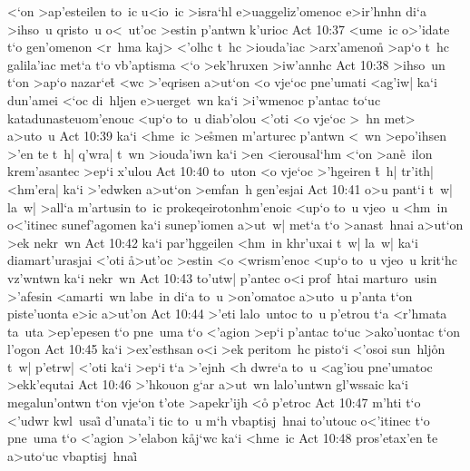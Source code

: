 <`on
>ap'esteilen
to~ic
u<io~ic
>isra`hl
e>uaggeliz'omenoc
e>ir'hnhn
di`a
>ihso~u
qristo~u
o<~ut'oc
>estin
p'antwn
k'urioc\bibvsend
\vs Act 10:37
<ume~ic
o>'idate
t`o
gen'omenon
<r~hma
kaj>
<'olhc
t~hc
>iouda'iac
>arx'ameno\r{n}
>ap`o
t~hc
galila'iac
met`a
t`o
vb'aptisma
<`o
>ek'hruxen
>iw'annhc\bibvsend
\vs Act 10:38
>ihso~un
t`on
>ap`o
nazar`e\r{t}
<wc
>'eqrisen
a>ut`on
<o
vje`oc
pne'umati
<ag'iw|
ka`i
dun'amei
<`oc
di~hljen
e>uerget~wn
ka`i
>i'wmenoc
p'antac
to`uc
katadunasteuom'enouc
<up`o
to~u
diab'olou
<'oti
<o
vje`oc
>~hn
met>
a>uto~u\bibvsend
\vs Act 10:39
ka`i
<hme~ic
>e\r{s}men
m'arturec
p'antwn
<~wn
>epo'ihsen
>'en
te
t~h|
q'wra|
t~wn
>iouda'iwn
ka`i
>en
<ierousal`hm
<`on
>an\r{e}~ilon
krem'asantec
>ep`i
x'ulou\bibvsend
\vs Act 10:40
to~uton
<o
vje`oc
>'hgeiren
\r{t}~h|
tr'ith|
<hm'era|
ka`i
>'edwken
a>ut`on
>emfan~h
gen'esjai\bibvsend
\vs Act 10:41
o>u
pant`i
t~w|
la~w|
>all`a
m'artusin
to~ic
prokeqeirotonhm'enoic
<up`o
to~u
vjeo~u
<hm~in
o<'itinec
sunef'agomen
ka`i
sunep'iomen
a>ut~w|
met`a
t`o
>anast~hnai
a>ut`on
>ek
nekr~wn\bibvsend
\vs Act 10:42
ka`i
par'hggeilen
<hm~in
khr'uxai
t~w|
la~w|
ka`i
diamart'urasjai
<'oti
\r{a}>ut'oc
>estin
<o
<wrism'enoc
<up`o
to~u
vjeo~u
krit`hc
vz'wntwn
ka`i
nekr~wn\bibvsend
\vs Act 10:43
to'utw|
p'antec
o<i
prof~htai
marturo~usin
>'afesin
<amarti~wn
labe~in
di`a
to~u
>on'omatoc
a>uto~u
p'anta
t`on
piste'uonta
e>ic
a>ut'on\bibvsend
\vs Act 10:44
>'eti
lalo~untoc
to~u
p'etrou
t`a
<r'hmata
ta~uta
>ep'epesen
t`o
pne~uma
t`o
<'agion
>ep`i
p'antac
to`uc
>ako'uontac
t`on
l'ogon\bibvsend
\vs Act 10:45
ka`i
>ex'esthsan
o<i
>ek
peritom~hc
pisto`i
<'osoi
sun~hlj\r{o}n
t~w|
p'etrw|
<'oti
ka`i
>ep`i
t`a
>'ejnh
<h
dwre`a
to~u
<ag'iou
pne'umatoc
>ekk'equtai\bibvsend
\vs Act 10:46
>'hkouon
g`ar
a>ut~wn
lalo'untwn
gl'wssaic
ka`i
megalun'ontwn
t`on
vje`on
t'ote
>apekr'ijh
<o\r{}
p'etroc\bibvsend
\vs Act 10:47
m'hti
t`o
<'udwr
kwl~usai\r{}
d'unata'i
tic
to~u
m`h
vbaptisj~hnai
to'utouc
o<'itinec
t`o
pne~uma
t`o
<'agion
>'elabon
k\r{a}j`wc
ka`i
<hme~ic\bibvsend
\vs Act 10:48
pros'etax'en
\r{t}e
a>uto`uc
vbaptisj~hnai\r{}
